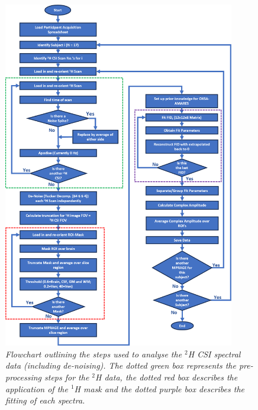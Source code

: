 \begin{figure}
    \centering
    \includegraphics[width = 0.9\textwidth]{Figures/Glucose/2H_Flow.png}
    \caption{\textit{Flowchart outlining the steps used to analyse the $^2$H \ac{CSI} spectral data (including de-noising). The dotted green box represents the pre-processing steps for the $^2$H data, the dotted red box describes the application of the $^1$H mask and the dotted purple box describes the fitting of each spectra.}}
    \label{fig:Glu:2H_Flow}
\end{figure}


